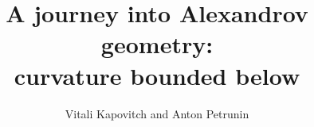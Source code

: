 \documentclass[twoside]{book}
\newcommand{\spell}[2]{#2} %
\def\thetitle{A journey into Alexandrov geometry:\\
curvature bounded below}
\def\theauthors{Vitali Kapovitch and Anton Petrunin}
\begin{document}
\spell{\pagestyle{empty}\renewcommand\includegraphics[2][{}]{}\def\emph{\textit}\renewcommand\footnote[1]{\ (#1)}\renewcommand\z{}\renewcommand\section[1]{SECTION. {#1} SECTION.}}{}

\frontmatter
\title{\thetitle}
\author{\theauthors}
\date{}
\maketitle
\thispagestyle{empty}

\mainmatter
\newpage
\tableofcontents





%











%

%
%



%

\backmatter


{


\def\emph{\textit}

\printbibliography[heading=bibintoc]
\fussy
}
\end{document}
